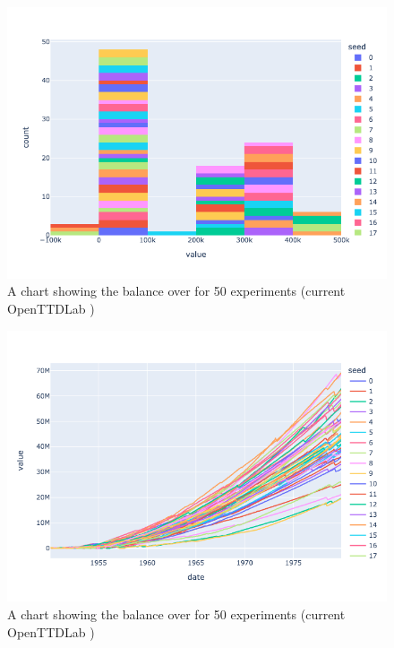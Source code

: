 \documentclass[logo,msc]{infthesis}           %
\begin{document}
\begin{figure}[h]
\centering
\includegraphics[width=\columnwidth]{assets/end-of-second-year-distribution.png}
\caption{A chart showing the balance over for 50 experiments (current OpenTTDLab )}
\label{fig:first-year}
\end{figure}

\begin{figure}[h]
\centering
\includegraphics[width=\columnwidth]{assets/value-over-time-2.png}
\caption{A chart showing the balance over for 50 experiments (current OpenTTDLab )}
\label{fig:value-over-time}
\end{figure}
\end{document}
